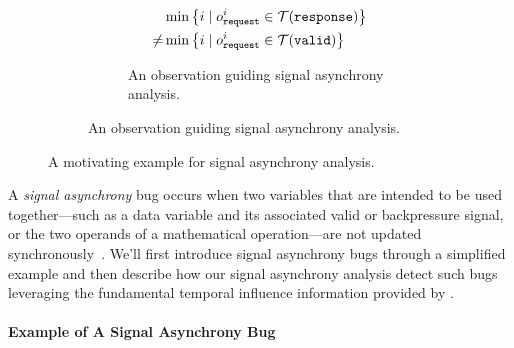\begin{figure}[tp]
\begin{subfigure}[b]{.53\textwidth}
        \vspace{1ex}

        \begin{subfigure}{\linewidth}
            \centering
            \footnotesize
            \[
            \begin{aligned}
                & \min\left\{i \mid o_{\mathtt{request}}^{i} \in \mathcal{T}(\mathtt{response})\right\} \\
                \ne &\min\left\{i \mid o_{\mathtt{request}}^{i} \in \mathcal{T}(\mathtt{valid})\right\} \\
            \end{aligned}
            \]
            \caption{An observation guiding signal asynchrony analysis.}
            \label{fig:asynchrony-observe}
        \end{subfigure}
    \end{subfigure}
    \hfill
    \caption{A motivating example for signal asynchrony analysis.}
\end{figure}

A \emph{signal asynchrony} bug occurs when two variables that are intended to be used together---such as a data variable and its associated valid or backpressure signal, or the two operands of a mathematical operation---are not updated synchronously~\cite{ma_debugging_2022}.
We'll first introduce signal asynchrony bugs through a simplified example and then describe how our signal asynchrony analysis detect such bugs leveraging the fundamental temporal influence information provided by \tia.

\paragraph{Example of A Signal Asynchrony Bug}

